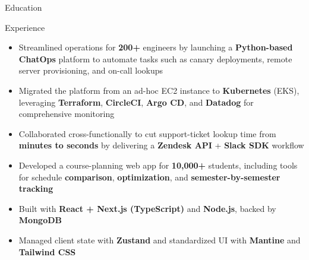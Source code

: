 \documentclass{resume}
\begin{document}
\introduction[
    fullname={Declan Blanchard},
    email={declanblanc@gmail.com},
    linkedin={linkedin.com/in/declanblanc},
    github={github.com/declanblanc}
]

\begin{educationSection}{Education}
    \educationItem[
        university={New Jersey Institute of Technology},
        graduation={May 2026},
        grade={\textbf{3.8 GPA}},
        program={Bachelor's, Computer Science}
    ]
\end{educationSection}

\begin{experienceSection}{Experience}


    \experienceItem[
        company={Patreon},
        location={New York, NY},
        position={Software Engineer Intern},
        duration={May 2025 - August 2025}
    ]
    \begin{itemize}[itemsep=-6pt, leftmargin=2em, rightmargin=0.8em, before=\raggedright, after=\normalfont]
        \item Streamlined operations for \textbf{200+} engineers by launching a \textbf{Python-based ChatOps} platform to automate tasks such as canary deployments, remote server provisioning, and on-call lookups
       \item Migrated the platform from an ad-hoc EC2 instance to \textbf{Kubernetes} (EKS), leveraging \textbf{Terraform}, \textbf{CircleCI}, \textbf{Argo CD}, and \textbf{Datadog} for comprehensive monitoring 
        \item Collaborated cross-functionally to cut support-ticket lookup time from \textbf{minutes to seconds} by delivering a \textbf{Zendesk API} + \textbf{Slack SDK} workflow
    \end{itemize}

    \experienceItem[
        company={New Jersey Institute of Technology},
        location={Newark, NJ},
        position={Full Stack Developer},
        duration={January 2025 - Present}
    ]
    \begin{itemize}[itemsep=-6pt, leftmargin=2em, rightmargin=0.8em, before=\raggedright, after=\normalfont]
        \item Developed a course-planning web app for \textbf{10,000+} students, including tools for schedule \textbf{comparison}, \textbf{optimization}, and \textbf{semester-by-semester tracking} 
        \item Built with \textbf{React + Next.js (TypeScript)} and \textbf{Node.js}, backed by \textbf{MongoDB}
        \item Managed client state with \textbf{Zustand} and standardized UI with \textbf{Mantine} and \textbf{Tailwind CSS}
    \end{itemize}



\end{experienceSection}
\end{document}
